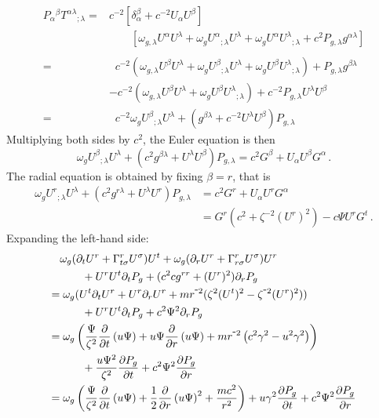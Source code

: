 \documentclass[../main.tex]{subfiles}
\begin{document}
\begin{align}
    P_\alpha{}^\beta T^{\alpha\lambda}{}_{;\lambda}=&c^{-2}\left[\delta_\alpha^\beta+c^{-2}U_\alpha U^\beta\right]\nonumber\\
    &\qquad\left[\omega_{g,\lambda}U^\alpha U^\lambda+\omega_gU^\alpha{}_{;\lambda}U^\lambda+\omega_gU^\alpha U^\lambda{}_{;\lambda}+c^2P_{g,\lambda}g^{\alpha\lambda}\right]\nonumber\\\nonumber\\
    =&\;\;c^{-2}(\omega_{g,\lambda}U^\beta U^\lambda+\omega_gU^\beta{}_{;\lambda}U^\lambda+\omega_gU^\beta U^\lambda{}_{;\lambda})+P_{g,\lambda}g^{\beta\lambda}\nonumber\\
    &-c^{-2}(\omega_{g,\lambda}U^\beta U^\lambda+\omega_g U^\beta U^\lambda{}_{;\lambda})+c^{-2}P_{g,\lambda}U^\lambda U^\beta\nonumber\\
    =&\;\;c^{-2}\omega_g U^\beta{}_{;\lambda}U^\lambda+(g^{\beta\lambda}+c^{-2}U^\lambda U^\beta)P_{g,\lambda}
\end{align}
Multiplying both sides by $c^2$, the Euler equation is then 
\begin{equation}
    \omega_g U^\beta{}_{;\lambda}U^\lambda+(c^2g^{\beta\lambda}+U^\lambda U^\beta)P_{g,\lambda}=c^2G^\beta+U_\alpha U^\beta G^\alpha\,.
\end{equation}
The radial equation is obtained by fixing $\beta=r$, that is
\begin{align}
    \omega_g U^r{}_{;\lambda}U^\lambda+(c^2g^{r\lambda}+U^\lambda U^r)P_{g,\lambda}&=c^2G^r+U_\alpha U^r G^\alpha\nonumber\\
    &=G^r(c^2+\zeta^{-2}(U^r)^2)-c\Psi U^rG^t\,.
\end{align}
Expanding the left-hand side:
\begin{align*}
    &\omega_g(\partial_t U^r+\chris{r}{t}{\sigma}U^\sigma)U^t +
    \omega_g(\partial_r U^r+\chris{r}{r}{\sigma}U^\sigma)U^r \\
    &\qquad+ U^r U^t\partial_t P_g+(c^2cg^{rr}+(U^r)^2)\partial_r P_g\\
    =&\;\omega_g(U^t\partial_t U^r +U^r\partial_r U^r +mr^{\-2}(\zeta^2 (U^t)^2-\zeta^{\-2}(U^r)^2))\\
    &\qquad+ U^r U^t\partial_t P_g+c^2\Psi^2\partial_r P_g\\
    =&\;\omega_g\left(\frac{\Psi}{\zeta^2}\Partial{t}{u\Psi}+u\Psi\Partial{r}{u\Psi}+mr^{\-2}\left(c^2\gamma^2-u^2\gamma^2\right)\right)\\
    &\qquad+ \frac{u\Psi^2}{\zeta^2}\frac{\partial P_g}{\partial t}+c^2\Psi^2\frac{\partial P_g}{\partial r}\\
    =&\;\omega_g\left(\frac{\Psi}{\zeta^2}\Partial{t}{u\Psi}+\frac{1}{2}\Partial{r}{u\Psi}^2+\frac{mc^2}{r^2}\right)+u\gamma^2\frac{\partial P_g}{\partial t}+c^2\Psi^2\frac{\partial P_g}{\partial r}
\end{align*}
\end{document}
